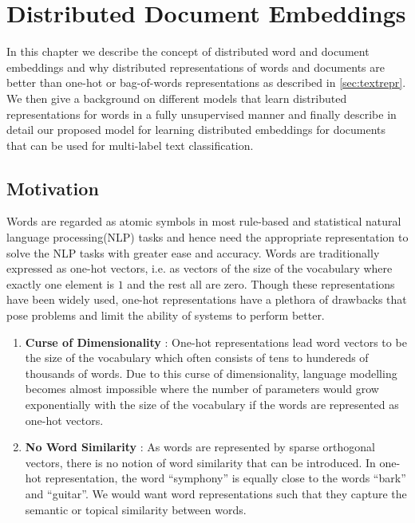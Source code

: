 \chapter{Distributed Document Embeddings}
\label{chapter:distembed}
In this chapter we describe the concept of distributed word and document embeddings and why distributed representations of words and documents are better than one-hot or bag-of-words representations as described in \ref{sec:textrepr}. We then give a background on different models that learn distributed representations for words in a fully unsupervised manner and finally describe in detail our proposed model for learning distributed embeddings for documents that can be used for multi-label text classification.

\section{Motivation}
\label{sec:motivation_distributed}


Words are regarded as atomic symbols in most rule-based and statistical natural language processing(NLP) tasks and hence need the appropriate representation to solve the NLP tasks with greater ease and accuracy. 
Words are traditionally expressed as one-hot vectors, i.e. as vectors of the size of the vocabulary where exactly one element is $1$ and the rest all are zero.
Though these representations have been widely used, one-hot representations have a plethora of drawbacks that pose problems and limit the ability of systems to perform better. 
\begin{enumerate}
\item \textbf{Curse of Dimensionality} : One-hot representations lead word vectors to be the size of the vocabulary which often consists of tens to hundereds of thousands of words. Due to this curse of dimensionality, language modelling becomes almost impossible where the number of parameters would grow exponentially with the size of the vocabulary if the words are represented as one-hot vectors.

\item \textbf{No Word Similarity} : As words are represented by sparse orthogonal vectors, there is no notion of word similarity that can be introduced. In one-hot representation, the word ``symphony'' is equally close to the words ``bark'' and ``guitar''. We would want word representations such that they capture the semantic or topical similarity between words.
\end{enumerate}

